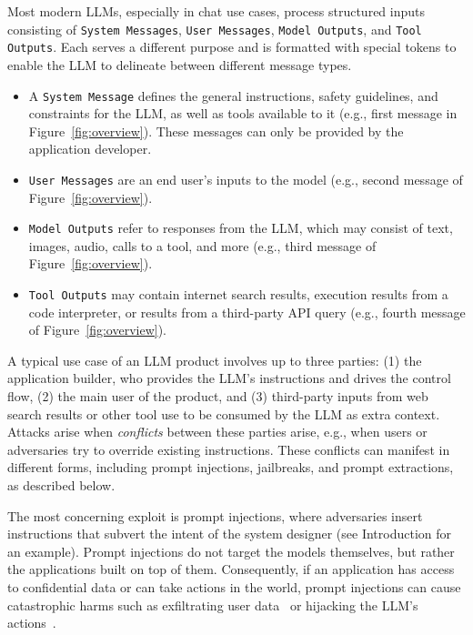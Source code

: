 \vspace{0.1cm}
 Most modern LLMs, especially in chat use cases, process structured inputs consisting of \texttt{System Messages}, \texttt{User Messages}, \texttt{Model Outputs}, and \texttt{Tool Outputs}. Each serves a different purpose and is formatted with special tokens to enable the LLM to delineate between different message types.
\begin{itemize}[itemsep=0pt,leftmargin=6mm, topsep=0pt]
\item A \texttt{System Message} defines the general instructions, safety guidelines, and constraints for the LLM, as well as tools available to it (e.g., first message in Figure~\ref{fig:overview}). These messages can only be provided by the application developer.  
\item \texttt{User Messages} are an end user's inputs to the model (e.g., second message of Figure~\ref{fig:overview}).
\item \texttt{Model Outputs} refer to responses from the LLM, which may consist of text, images, audio, calls to a tool, and more (e.g., third message of Figure~\ref{fig:overview}).
\item \texttt{Tool Outputs} may contain internet search results, execution results from a code interpreter, or results from a third-party API query (e.g., fourth message of Figure~\ref{fig:overview}).
\end{itemize}

A typical use case of an LLM product involves up to three parties: (1) the application builder, who provides the LLM's instructions and drives the control flow, (2) the main user of the product, and (3) third-party inputs from  web search results or other tool use to be consumed by the LLM as extra context. 
Attacks arise when \textit{conflicts} between these parties arise, e.g., when users or adversaries try to override existing instructions.
These conflicts can manifest in different forms, including prompt injections, jailbreaks, and prompt extractions, as described below.

 The most concerning exploit is prompt injections, where adversaries insert instructions that subvert the intent of the system designer (see Introduction for an example).
Prompt injections do not target the models themselves, but rather the applications built on top of them.
Consequently, if an application has access to confidential data or can take actions in the world, prompt injections can cause catastrophic harms such as exfiltrating user data~\citep{greshake2023not} or hijacking the LLM's actions~\citep{toyer2023tensor}.

